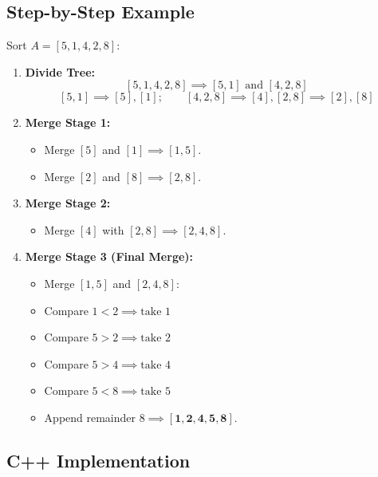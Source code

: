 \subsection{Step-by-Step Example}
Sort $A = [5, 1, 4, 2, 8]$:
\begin{enumerate}
    \item \textbf{Divide Tree:}
    \[
    [5, 1, 4, 2, 8] \implies [5, 1] \text{ and } [4, 2, 8]
    \]
    \[
    [5, 1] \implies [5], [1]; \qquad [4, 2, 8] \implies [4], [2, 8] \implies [2], [8]
    \]
    \item \textbf{Merge Stage 1:}
    \begin{itemize}
        \item Merge $[5]$ and $[1] \implies [1, 5]$.
        \item Merge $[2]$ and $[8] \implies [2, 8]$.
    \end{itemize}
    \item \textbf{Merge Stage 2:}
    \begin{itemize}
        \item Merge $[4]$ with $[2, 8] \implies [2, 4, 8]$.
    \end{itemize}
    \item \textbf{Merge Stage 3 (Final Merge):}
    \begin{itemize}
        \item Merge $[1, 5]$ and $[2, 4, 8]$:
        \item Compare $1 < 2 \implies \text{take } 1$
        \item Compare $5 > 2 \implies \text{take } 2$
        \item Compare $5 > 4 \implies \text{take } 4$
        \item Compare $5 < 8 \implies \text{take } 5$
        \item Append remainder $8 \implies \mathbf{[1, 2, 4, 5, 8]}$.
    \end{itemize}
\end{enumerate}

\subsection{C++ Implementation}


